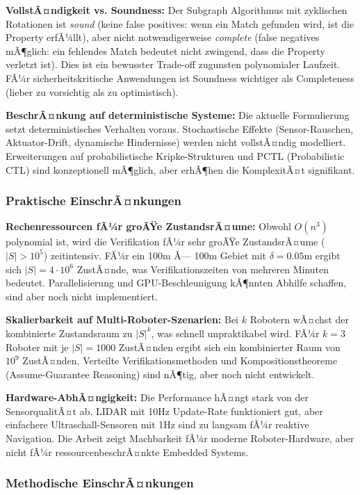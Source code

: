 ﻿\documentclass[a4paper,12pt]{article}
\theoremstyle{definition}
\begin{document}
\textbf{VollstÃ¤ndigkeit vs. Soundness:}
Der Subgraph Algorithmus mit zyklischen Rotationen ist \textit{sound} (keine false positives: wenn ein Match gefunden wird, ist die Property erfÃ¼llt), aber nicht notwendigerweise \textit{complete} (false negatives mÃ¶glich: ein fehlendes Match bedeutet nicht zwingend, dass die Property verletzt ist). Dies ist ein bewusster Trade-off zugunsten polynomialer Laufzeit. FÃ¼r sicherheitskritische Anwendungen ist Soundness wichtiger als Completeness (lieber zu vorsichtig als zu optimistisch).

\textbf{BeschrÃ¤nkung auf deterministische Systeme:}
Die aktuelle Formulierung setzt deterministisches Verhalten voraus. Stochastische Effekte (Sensor-Rauschen, Aktuator-Drift, dynamische Hindernisse) werden nicht vollstÃ¤ndig modelliert. Erweiterungen auf probabilistische Kripke-Strukturen und PCTL (Probabilistic CTL) sind konzeptionell mÃ¶glich, aber erhÃ¶hen die KomplexitÃ¤t signifikant.

\subsubsection{Praktische EinschrÃ¤nkungen}

\textbf{Rechenressourcen fÃ¼r groÃŸe ZustandsrÃ¤ume:}
Obwohl $O(n^3)$ polynomial ist, wird die Verifikation fÃ¼r sehr groÃŸe ZustandsrÃ¤ume ($|S| > 10^5$) zeitintensiv. FÃ¼r ein 100m Ã— 100m Gebiet mit $\delta = 0.05$m ergibt sich $|S| = 4 \cdot 10^6$ ZustÃ¤nde, was Verifikationszeiten von mehreren Minuten bedeutet. Parallelisierung und GPU-Beschleunigung kÃ¶nnten Abhilfe schaffen, sind aber noch nicht implementiert.

\textbf{Skalierbarkeit auf Multi-Roboter-Szenarien:}
Bei $k$ Robotern wÃ¤chst der kombinierte Zustandsraum zu $|S|^k$, was schnell unpraktikabel wird. FÃ¼r $k = 3$ Roboter mit je $|S| = 1000$ ZustÃ¤nden ergibt sich ein kombinierter Raum von $10^9$ ZustÃ¤nden. Verteilte Verifikationsmethoden und Kompositionstheoreme (Assume-Guarantee Reasoning) sind nÃ¶tig, aber noch nicht entwickelt.

\textbf{Hardware-AbhÃ¤ngigkeit:}
Die Performance hÃ¤ngt stark von der SensorqualitÃ¤t ab. LIDAR mit 10Hz Update-Rate funktioniert gut, aber einfachere Ultraschall-Sensoren mit 1Hz sind zu langsam fÃ¼r reaktive Navigation. Die Arbeit zeigt Machbarkeit fÃ¼r moderne Roboter-Hardware, aber nicht fÃ¼r ressourcenbeschrÃ¤nkte Embedded Systems.

\subsubsection{Methodische EinschrÃ¤nkungen}
\end{document}
